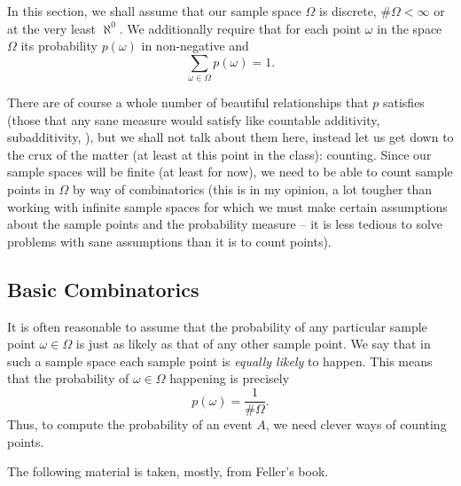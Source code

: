 In this section, we shall assume that our sample space \(\Omega\) is
discrete,\ie{} \(\#\Omega<\infty\) or at the very least \(\aleph^0\). We
additionally require that for each point \(\omega\) in the space \(\Omega\)
its probability \(p(\omega)\) in non-negative and
\begin{equation}
  \label{eq:convention-prob}
  \sum_{\omega\in\Omega}p(\omega)=1.
\end{equation}

There are of course a whole number of beautiful relationships that \(p\)
satisfies (those that any sane measure would satisfy like countable
additivity, subadditivity, \etc{}), but we shall not talk about them here,
instead let us get down to the crux of the matter (at least at this point
in the class): counting. Since our sample spaces will be finite (at least
for now), we need to be able to count sample points in \(\Omega\) by way of
combinatorics (this is in my opinion, a lot tougher than working with
infinite sample spaces for which we must make certain assumptions about the
sample points and the probability measure -- it is less tedious to solve
problems with sane assumptions than it is to count points).

\subsection{Basic Combinatorics}
It is often reasonable to assume that the probability of any particular
sample point \(\omega\in\Omega\) is just as likely as that of any other
sample point. We say that in such a sample space each sample point is
\emph{equally likely} to happen. This means that the probability of
\(\omega\in\Omega\) happening is precisely
\[
  p(\omega)=\frac{1}{\#\Omega}.
\]
Thus, to compute the probability of an event \(A\), we need clever ways of
counting points.

The following material is taken, mostly, from Feller's book.


